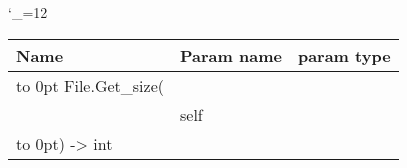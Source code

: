 \begingroup \catcode`\_=12 \tt
\begin{tabular}{lll}
\toprule
\textrm{Name}&\textrm{Param name}&\textrm{param type}\\
\midrule
\hbox to 0pt {File.Get_size(\hss}\\
& self\\
\hbox to 0pt{) -> int\hss}\\
\bottomrule
\end{tabular}
\endgroup
